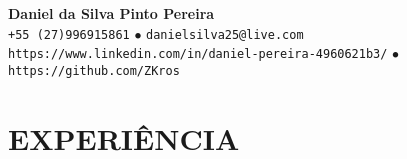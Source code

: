 \begin{center}
	\textbf{\Huge Daniel da Silva Pinto Pereira} \\ \vspace{5pt}
	\small \faPhone* \texttt{+55 (27)996915861} \hspace{1pt} $•$
	\hspace{1pt} \faEnvelope \hspace{2pt} \texttt{danielsilva25@live.com} \hspace{1pt}
	\\ \hspace{1pt} \faLinkedin \hspace{2pt} \texttt{https://www.linkedin.com/in/daniel-pereira-4960621b3/} $•$
	\hspace{1pt} \faGithub \hspace{2pt} \texttt{https://github.com/ZKros}
	\\ \vspace{-3pt}
\end{center}

\section{EXPERIÊNCIA}
\resumeSubHeadingListStart

